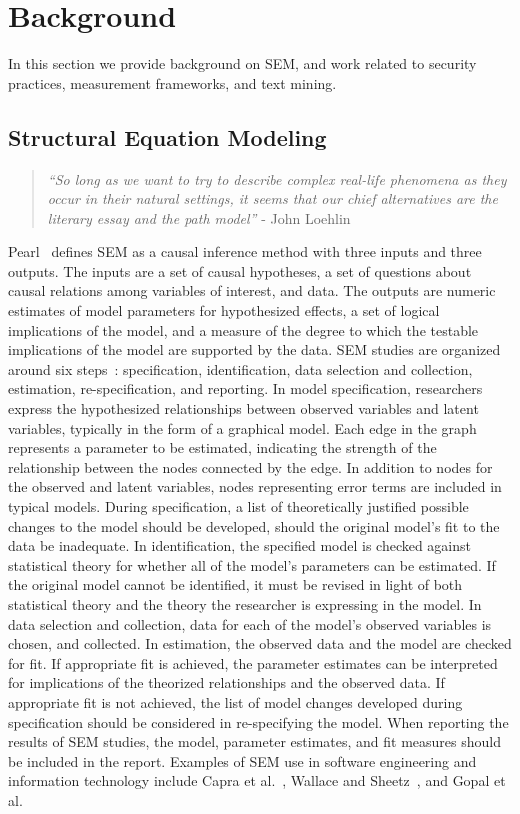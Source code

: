 \section{Background}
\label{sec:background}
In this section we provide background on SEM, and work related to security practices, measurement frameworks, and text mining.
\subsection{Structural Equation Modeling}

\begin{quotation}
	\textit{“So long as we want to try to describe complex real-life phenomena as they
		occur in their natural settings, it seems that our chief alternatives are the
		literary essay and the path model”} - John Loehlin ~\cite{loehlin1986latent}
\end{quotation}
Pearl~\cite{pearl2012causal} defines SEM as a causal inference method with three inputs and three outputs.  The inputs are a set of causal hypotheses, a set of questions about causal relations among variables of interest, and data.  The outputs are numeric estimates of model parameters for hypothesized effects, a set of logical implications of the model, and a measure of the degree to which the testable implications of the model are supported by the data. 
SEM studies are organized around six steps~\cite{kline2015principles}: specification, identification, data selection and collection, estimation, re-specification, and reporting. In model specification, researchers express the hypothesized relationships between observed variables and latent variables, typically in the form of a graphical model. Each edge in the graph represents a parameter to be estimated, indicating the strength of the relationship between the nodes connected by the edge. In addition to nodes for the observed and latent variables, nodes representing error terms are included in typical models. During specification, a list of theoretically justified possible changes to the model should be developed, should the original model’s fit to the data be inadequate. In identification, the specified model is checked against statistical theory for whether all of the model’s parameters can be estimated. If the original model cannot be identified, it must be revised in light of both statistical theory and the theory the researcher is expressing in the model. In data selection and collection, data for each of the model’s observed variables is chosen, and collected. In estimation, the observed data and the model are checked for fit.  If appropriate fit is achieved, the parameter estimates can be interpreted for implications of the theorized relationships and the observed data. If appropriate fit is not achieved, the list of model changes developed during specification should be considered in re-specifying the model.  When reporting the results of SEM studies, the model, parameter estimates, and fit measures should be included in the report.
Examples of SEM use in software engineering and information technology include Capra et al.~\cite{capra2008empirical}, Wallace and Sheetz~\cite{wallace2014adoption}, and Gopal et al.~\cite{gopal2005impact} 
